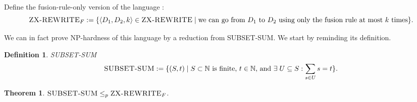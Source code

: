 \documentclass[journal,onecolumn]{IEEEtran}
\newtheorem{definition}{Definition}
\newtheorem{theorem}{Theorem}
\begin{document}
Define the fusion-rule-only version of the language :
$$
\textsc{ZX-REWRITE}_F := \{ \left< D_1, D_2, k \right> \in \textsc{ZX-REWRITE}\; | \; \text{we can go from } D_1 \text{ to } D_2 \text{ using only the fusion rule at most } k \text{ times}\}.
$$ 

We can in fact prove \textsc{NP}-hardness of this language by a reduction from \textsc{SUBSET-SUM}. We start by reminding its definition.
\begin{definition}{\textsc{SUBSET-SUM}}{}
	$$
	\textsc{SUBSET-SUM} := \{(S, t) \; | \; S \subset \mathbb{N} \text{ is finite, } t \in \mathbb{N} \text{, and } \exists \; U \subseteq S : \sum_{s \in U} s = t \}.
	$$ 
\end{definition}

\begin{theorem}{}{}
$\textsc{SUBSET-SUM} \leq_p \textsc{ZX-REWRITE}_F$.
\end{theorem}
\end{document}

